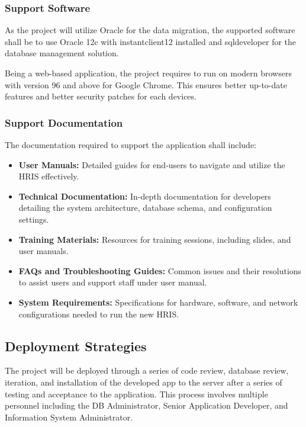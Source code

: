         \subsubsection{Support Software}

        As the project will utilize Oracle for the data migration, the supported software shall be to use Oracle 12c with instantclient12 installed and sqldeveloper for the database management solution. 

        Being a web-based application, the project requires to run on modern browsers with version 96 and above for Google Chrome. This ensures better up-to-date features and better security patches for each devices.

        \subsubsection{Support Documentation}

        The documentation required to support the application shall include:

        \begin{itemize}
            \item[] \textbf{User Manuals:} Detailed guides for end-users to navigate and utilize the HRIS effectively.
            \item[] \textbf{Technical Documentation:} In-depth documentation for developers detailing the system architecture, database schema, and configuration settings.
            \item[] \textbf{Training Materials:} Resources for training sessions, including slides, and user manuals.
            \item[] \textbf{FAQs and Troubleshooting Guides:} Common issues and their resolutions to assist users and support staff under user manual.
            \item[] \textbf{System Requirements:} Specifications for hardware, software, and network configurations needed to run the new HRIS.
        \end{itemize}

    \subsection{Deployment Strategies}
    
    The project will be deployed through a series of code review, database review, iteration, and installation of the developed app to the server after a series of testing and acceptance to the application. This process involves multiple personnel including the DB Administrator, Senior Application Developer, and Information System Administrator. 
    
